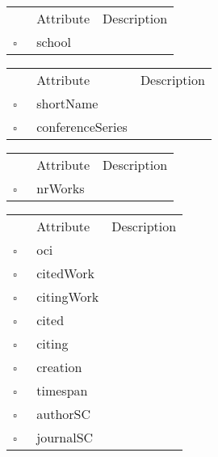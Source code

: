 \begin{table}
\caption{PhDThesis  }

\begin{longtable}{llp{8cm}}
& Attribute & Description \\
$\square$\ & school &  \\
\end{longtable}
\label{attr:PhDThesis}
\end{table}

\begin{table}
\caption{Proceedings  }

\begin{longtable}{llp{8cm}}
& Attribute & Description \\
$\square$\ & shortName &  \\
$\square$\ & conferenceSeries &  \\
\end{longtable}
\label{attr:Proceedings}
\end{table}

\clearpage
\begin{table}
\caption{Publisher  }

\begin{longtable}{llp{8cm}}
& Attribute & Description \\
$\square$\ & nrWorks &  \\
\end{longtable}
\label{attr:Publisher}
\end{table}

\begin{table}
\caption{Reference  }

\begin{longtable}{llp{8cm}}
& Attribute & Description \\
$\square$\ & oci &  \\
$\square$\ & citedWork &  \\
$\square$\ & citingWork &  \\
$\square$\ & cited &  \\
$\square$\ & citing &  \\
$\square$\ & creation &  \\
$\square$\ & timespan &  \\
$\square$\ & authorSC &  \\
$\square$\ & journalSC &  \\
\end{longtable}
\label{attr:Reference}
\end{table}

